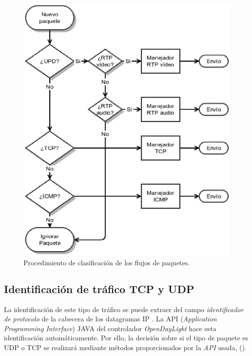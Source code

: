 \documentclass[a4paper,11pt]{book}
\begin{document}
\begin{figure}[tb]
\centering
\includegraphics[scale=0.5]{./figuras/packetType}
\caption[Clasificación de paquetes.]{Procedimiento de clasificación de los flujos de paquetes.}
\label{packetType}
\end{figure}

\subsection{Identificación de tráfico \acs{TCP} y \acs{UDP}}

La identificación de este tipo de tráfico se puede extraer del campo \emph{identificador de protocolo} de la cabecera de los datagramas IP \cite{rfcIP}. La \acs{API} (\emph{Application Programming Interface}) JAVA del controlador \emph{OpenDayLight} hace esta identificación automáticamente. Por ello, la decisión sobre si el tipo de paquete es \ac{UDP} o \ac{TCP} se realizará mediante métodos proporcionados por la \emph{API} usada, (\cite{ciscojavadoc}).

\end{document}
